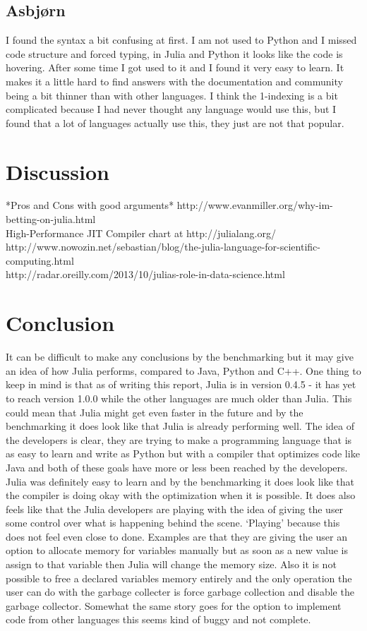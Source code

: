 \documentclass[a4paper, 11pt, titlepage]{article}
\begin{document}
\subsection{Asbjørn}
I found the syntax a bit confusing at first. I am not used to Python and I missed code structure and forced typing, in Julia and Python it looks like the code is hovering. After some time I got used to it and I found it very easy to learn. It makes it a little hard to find answers with the documentation and community being a bit thinner than with other languages. I think the 1-indexing is a bit complicated because I had never thought any language would use this, but I found that a lot of languages actually use this, they just are not that popular.

\section{Discussion}
*Pros and Cons with good arguments*
http://www.evanmiller.org/why-im-betting-on-julia.html \\
High-Performance JIT Compiler chart at http://julialang.org/ \\
http://www.nowozin.net/sebastian/blog/the-julia-language-for-scientific-computing.html \\
http://radar.oreilly.com/2013/10/julias-role-in-data-science.html \\

\section{Conclusion}
It can be difficult to make any conclusions by the benchmarking but it may give an idea of how Julia performs, compared to Java, Python and C++. One thing to keep in mind is that as of writing this report, Julia is in version 0.4.5 - it has yet to reach version 1.0.0 while the other languages are much older than Julia. This could mean that Julia might get even faster in the future and by the benchmarking it does look like that Julia is already performing well. The idea of the developers is clear, they are trying to make a programming language that is as easy to learn and write as Python but with a compiler that optimizes code like Java and both of these goals have more or less been reached by the developers. Julia was definitely easy to learn and by the benchmarking it does look like that the compiler is doing okay with the optimization when it is possible. It does also feels like that the Julia developers are playing with the idea of giving the user some control over what is happening behind the scene. ‘Playing’ because this does not feel even close to done. Examples are that they are giving the user an option to allocate memory for variables manually but as soon as a new value is assign to that variable then Julia will change the memory size. Also it is not possible to free a declared variables memory entirely and the only operation the user can do with the garbage collecter is force garbage collection and disable the garbage collector. Somewhat the same story goes for the option to implement code from other languages this seems kind of buggy and not complete.
\end{document}
